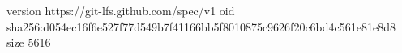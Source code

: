 version https://git-lfs.github.com/spec/v1
oid sha256:d054ec16f6e527f77d549b7f41166bb5f8010875c9626f20c6bd4c561e81e8d8
size 5616

